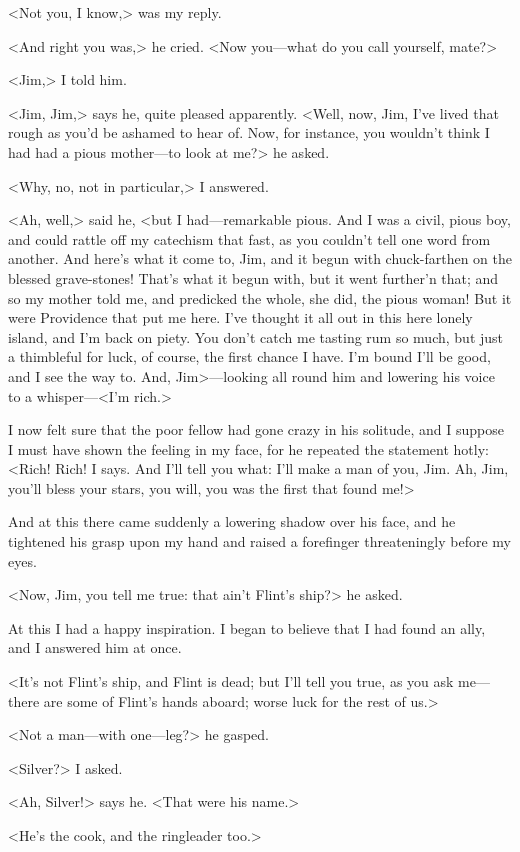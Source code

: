 <Not you, I know,> was my reply.

<And right you was,> he cried. <Now you—what do you call yourself, mate?>

<Jim,> I told him.

<Jim, Jim,> says he, quite pleased apparently. <Well, now, Jim, I've lived that rough as you'd be ashamed to hear of. Now, for instance, you wouldn't think I had had a pious mother—to look at me?> he asked.

<Why, no, not in particular,> I answered.

<Ah, well,> said he, <but I had—remarkable pious. And I was a civil, pious boy, and could rattle off my catechism that fast, as you couldn't tell one word from another. And here's what it come to, Jim, and it begun with chuck-farthen on the blessed grave-stones! That's what it begun with, but it went further'n that; and so my mother told me, and predicked the whole, she did, the pious woman! But it were Providence that put me here. I've thought it all out in this here lonely island, and I'm back on piety. You don't catch me tasting rum so much, but just a thimbleful for luck, of course, the first chance I have. I'm bound I'll be good, and I see the way to. And, Jim>—looking all round him and lowering his voice to a whisper—<I'm rich.>

I now felt sure that the poor fellow had gone crazy in his solitude, and I suppose I must have shown the feeling in my face, for he repeated the statement hotly: <Rich! Rich! I says. And I'll tell you what: I'll make a man of you, Jim. Ah, Jim, you'll bless your stars, you will, you was the first that found me!>

And at this there came suddenly a lowering shadow over his face, and he tightened his grasp upon my hand and raised a forefinger threateningly before my eyes.

<Now, Jim, you tell me true: that ain't Flint's ship?> he asked.

At this I had a happy inspiration. I began to believe that I had found an ally, and I answered him at once.

<It's not Flint's ship, and Flint is dead; but I'll tell you true, as you ask me—there are some of Flint's hands aboard; worse luck for the rest of us.>

<Not a man—with one—leg?> he gasped.

<Silver?> I asked.

<Ah, Silver!> says he. <That were his name.>

<He's the cook, and the ringleader too.>

